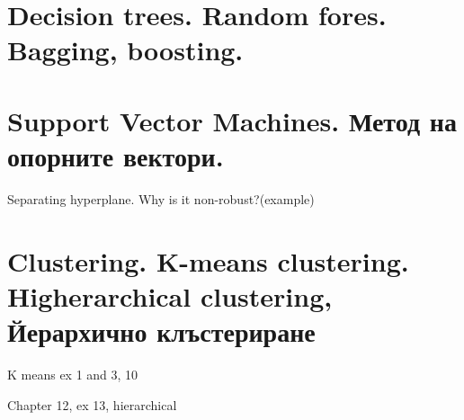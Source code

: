 \documentclass{article}
\begin{document}
	
	
\newpage	
\section{Decision trees. Random fores. Bagging, boosting.}
	
\newpage
\section{Support Vector Machines. Метод на опорните вектори.}	
Separating hyperplane. Why is it non-robust?(example) \\

	
	
	
\newpage
\section{Clustering. K-means clustering. Higherarchical clustering, Йерархично клъстериране}	

	K means ex 1 and 3, 10

	Chapter 12, ex 13, hierarchical \\ 

	\cite{hastie01statisticallearning}
	
	
	\newpage
	
	\printbibliography

%	
%	
%	
%	
	
\end{document}
